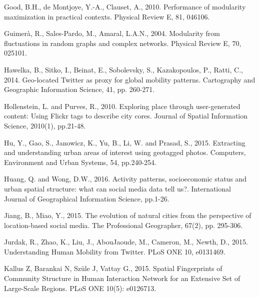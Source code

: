 \documentclass[]{tGIS2e}
\begin{document}
\begin{thebibliography}{9}
Good, B.H., de Montjoye, Y.-A., Clauset, A., 2010. Performance of modularity maximization in practical contexts. Physical Review E, 81, 046106.

Guimerà, R., Sales-Pardo, M., Amaral, L.A.N., 2004. Modularity from fluctuations in random graphs and complex networks. Physical Review E, 70, 025101.

Hawelka, B., Sitko, I., Beinat, E., Sobolevsky, S., Kazakopoulos, P., Ratti, C., 2014. Geo-located Twitter as proxy for global mobility patterns. Cartography and Geographic Information Science, 41, pp. 260-271.

Hollenstein, L. and Purves, R., 2010. Exploring place through user-generated content: Using Flickr tags to describe city cores. Journal of Spatial Information Science, 2010(1), pp.21-48.

Hu, Y., Gao, S., Janowicz, K., Yu, B., Li, W. and Prasad, S., 2015. Extracting and understanding urban areas of interest using geotagged photos. Computers, Environment and Urban Systems, 54, pp.240-254.

Huang, Q. and Wong, D.W., 2016. Activity patterns, socioeconomic status and urban spatial structure: what can social media data tell us?. International Journal of Geographical Information Science, pp.1-26.

Jiang, B., Miao, Y., 2015. The evolution of natural cities from the perspective of location-based social media. The Professional Geographer, 67(2), pp. 295-306.

Jurdak, R., Zhao, K., Liu, J., AbouJaoude, M., Cameron, M., Newth, D., 2015. Understanding Human Mobility from Twitter. PLoS ONE 10, e0131469.

Kallus Z, Barankai N, Szüle J, Vattay G., 2015. Spatial Fingerprints of Community Structure in Human Interaction Network for an Extensive Set of Large-Scale Regions. PLoS ONE 10(5): e0126713. 


\end{thebibliography}
\end{document}
